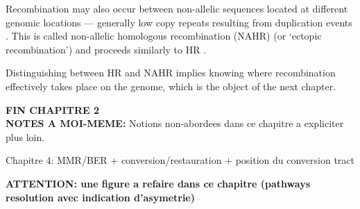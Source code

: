 Recombination may also occur between non-allelic sequences located at different genomic locations — generally low copy repeats resulting from duplication events \citep{bailey2006primate}. 
This is called non-allelic homologous recombination (NAHR) (or ‘ectopic recombination’) and proceeds similarly to HR \citep{sasaki2010genome}.


Distinguishing between HR and NAHR implies knowing where recombination effectively takes place on the genome, which is the object of the next chapter.

\textbf{FIN CHAPITRE 2}\\





\textbf{NOTES A MOI-MEME\@:} Notions non-abordees dans ce chapitre a expliciter plus loin.

Chapitre 4: MMR/BER + conversion/restauration + position du conversion tract

\textbf{ATTENTION\@: une figure a refaire dans ce chapitre (pathways resolution avec indication d'asymetrie)}




